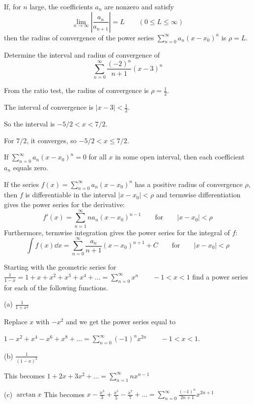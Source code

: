 \documentclass[../diffeq.tex]{subfiles}
\begin{document}
\begin{theorem}
    If, for $n$ large, the coefficients $a_n$ are nonzero and satisfy 
    \[ \lim_{n\to \infty} \left|\frac{a_n}{a_{n+1}}\right| = L \qquad (0\leq L\leq \infty) \]
    then the radius of convergence of the power series $\sum_{n=0}^{\infty}a_n(x-x_0)^n$ is $\rho = L$.
\end{theorem}

\begin{example}
    Determine the interval and radius of convergence of 
    \[ \sum_{n=0}^{\infty}\frac{(-2)^n}{n+1}(x-3)^n \]

    From the ratio test, the radius of convergence is $\rho=\frac{1}{2}$.

    The interval of convergence is $|x-3|<\frac{1}{2}$.

    So the interval is $-5/2<x<7/2$.

    For $7/2$, it converges, so $-5/2<x\leq 7/2$.
\end{example}

\begin{theorem}
    If $\sum_{n=0}^{\infty} a_n(x-x_0)^n=0$ for all $x$ in some open interval, then each coefficient $a_n$ equals zero.
\end{theorem}

\begin{theorem}
    If the series $f(x)=\sum_{n=0}^{\infty}a_n(x-x_0)^n$ has a positive radius of convergence $\rho$, then $f$ is differentiable in the interval $|x-x_0|<\rho$ and termwise 
    differentiation gives the power series for the derivative:
    \[ f'(x)=\sum_{n=1}^{\infty}na_n(x-x_0)^{n-1} \qquad \text{for} \qquad |x-x_0|<\rho \]
    Furthermore, termwise integration gives the power series for the integral of $f$:
    \[ \int f(x)\dd x = \sum^{\infty}_{n=0}\frac{a_n}{n+1} (x-x_0)^{n+1} + C \qquad \text{for} \qquad |x-x_0| < \rho \]
\end{theorem}
\pagebreak
\begin{example}
    Starting with the geometric series for $\frac{1}{1-x}=1+x+x^2+x^3+x^4+\dots = \sum_{n=0}^{\infty}x^n \qquad -1<x<1$ find a power series for each of the following functions.

    (a) $\frac{1}{1+x^2}$

    Replace $x$ with $-x^2$ and we get the power series equal to 
    
    $1-x^2+x^4-x^6+x^8+\dots = \sum_{n=0}^{\infty}(-1)^n x^{2n} \qquad -1<x<1$.

    (b) $\frac{1}{(1-x)^2}$

    This becomes $1+2x+3x^2+\dots = \sum_{n=1}^{\infty}nx^{n-1}$

    (c) $\arctan x$
    This becomes $x-\frac{x^3}{3}+\frac{x^5}{5}-\frac{x^7}{7}+\dots = \sum_{n=0}^{\infty}\frac{(-1)^n}{2n+1}x^{2n+1}$
\end{example}
\end{document}

